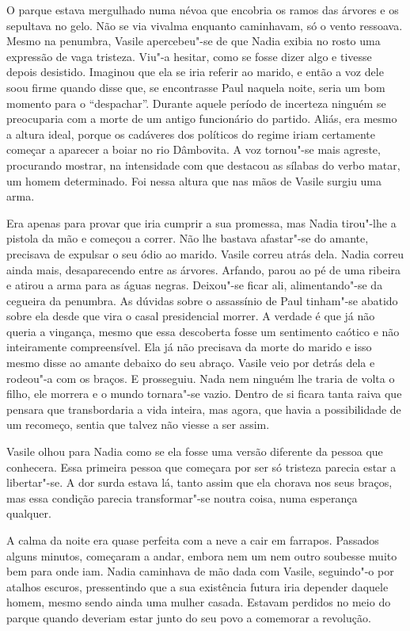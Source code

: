 O parque estava mergulhado numa névoa que encobria os ramos das árvores
e os sepultava no gelo. Não se via vivalma enquanto caminhavam, só o
vento ressoava. Mesmo na penumbra, Vasile apercebeu"-se de que Nadia
exibia no rosto uma expressão de vaga tristeza. Viu"-a hesitar, como se
fosse dizer algo e tivesse depois desistido. Imaginou que ela se iria
referir ao marido, e então a voz dele soou firme quando disse que, se
encontrasse Paul naquela noite, seria um bom momento para o ``despachar''. Durante aquele período de incerteza ninguém se preocuparia com a
morte de um antigo funcionário do partido. Aliás, era mesmo a altura
ideal, porque os cadáveres dos políticos do regime iriam certamente
começar a aparecer a boiar no rio Dâmbovita. A voz tornou"-se mais
agreste, procurando mostrar, na intensidade com que destacou as
sílabas do verbo matar, um homem determinado. Foi nessa altura que nas
mãos de Vasile surgiu uma arma.

Era apenas para provar que iria cumprir
a sua promessa, mas Nadia tirou"-lhe a pistola da mão e começou a
correr. Não lhe bastava afastar"-se do amante, precisava de expulsar o
seu ódio ao marido. Vasile correu atrás dela. Nadia correu ainda mais,
desaparecendo entre as árvores. Arfando, parou ao pé de uma ribeira e
atirou a arma para as águas negras. Deixou"-se ficar ali, alimentando"-se
da cegueira da penumbra. As dúvidas sobre o assassínio de Paul tinham"-se
abatido sobre ela desde que vira o casal presidencial morrer. A verdade
é que já não queria a vingança, mesmo que essa descoberta fosse um
sentimento
caótico e não inteiramente compreensível. Ela já não precisava da
morte do marido e isso mesmo disse ao amante debaixo do seu abraço.
Vasile veio por detrás dela e rodeou"-a com os braços. E prosseguiu. Nada
nem ninguém lhe traria de volta o filho, ele morrera e o mundo tornara"-se vazio. Dentro de si ficara tanta raiva que pensara que transbordaria
a vida inteira, mas agora, que havia a possibilidade de um recomeço,
sentia que talvez não viesse a ser assim.

Vasile olhou para Nadia como se ela fosse uma versão diferente da pessoa
que conhecera. Essa primeira pessoa que começara por ser só tristeza
parecia estar a libertar"-se. A dor surda estava lá, tanto assim que ela
chorava nos seus braços, mas essa condição parecia transformar"-se noutra
coisa, numa esperança qualquer.

A calma da noite era quase perfeita com a neve a cair em farrapos.
Passados alguns minutos, começaram a andar, embora nem um nem outro
soubesse muito bem para onde iam. Nadia caminhava de mão dada com
Vasile, seguindo"-o por atalhos escuros, pressentindo que a sua
existência futura iria depender daquele homem, mesmo sendo ainda uma
mulher casada. Estavam perdidos no meio do parque quando deveriam estar
junto do seu povo a comemorar a revolução.

